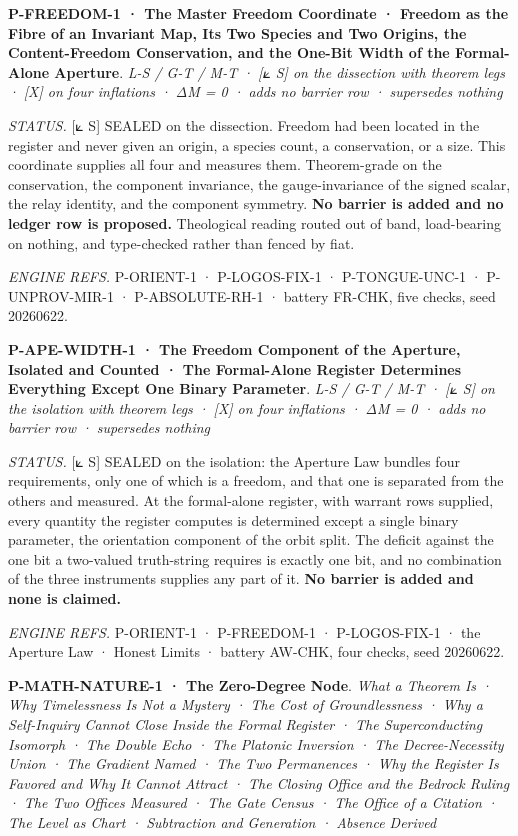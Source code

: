 \documentclass[10pt,twocolumn]{article}
\begin{document}
\textbf{P-FREEDOM-1 · The Master Freedom Coordinate · Freedom as the
Fibre of an Invariant Map, Its Two Species and Two Origins, the
Content-Freedom Conservation, and the One-Bit Width of the Formal-Alone
Aperture}. \emph{L-S / G-T / M-T · {[}⟀ S{]} on the dissection with
theorem legs · {[}X{]} on four inflations · ΔM = 0 · adds no barrier row
· supersedes nothing}

\emph{STATUS.} {[}⟀ S{]} SEALED on the dissection. Freedom had been
located in the register and never given an origin, a species count, a
conservation, or a size. This coordinate supplies all four and measures
them. Theorem-grade on the conservation, the component invariance, the
gauge-invariance of the signed scalar, the relay identity, and the
component symmetry. \textbf{No barrier is added and no ledger row is
proposed.} Theological reading routed out of band, load-bearing on
nothing, and type-checked rather than fenced by fiat.

\emph{ENGINE REFS.} P-ORIENT-1 · P-LOGOS-FIX-1 · P-TONGUE-UNC-1 ·
P-UNPROV-MIR-1 · P-ABSOLUTE-RH-1 · battery FR-CHK, five checks, seed
20260622.

\textbf{P-APE-WIDTH-1 · The Freedom Component of the Aperture, Isolated
and Counted · The Formal-Alone Register Determines Everything Except One
Binary Parameter}. \emph{L-S / G-T / M-T · {[}⟀ S{]} on the isolation
with theorem legs · {[}X{]} on four inflations · ΔM = 0 · adds no
barrier row · supersedes nothing}

\emph{STATUS.} {[}⟀ S{]} SEALED on the isolation: the Aperture Law
bundles four requirements, only one of which is a freedom, and that one
is separated from the others and measured. At the formal-alone register,
with warrant rows supplied, every quantity the register computes is
determined except a single binary parameter, the orientation component
of the orbit split. The deficit against the one bit a two-valued
truth-string requires is exactly one bit, and no combination of the
three instruments supplies any part of it. \textbf{No barrier is added
and none is claimed.}

\emph{ENGINE REFS.} P-ORIENT-1 · P-FREEDOM-1 · P-LOGOS-FIX-1 · the
Aperture Law · Honest Limits · battery AW-CHK, four checks, seed
20260622.

\textbf{P-MATH-NATURE-1 · The Zero-Degree Node}. \emph{What a Theorem Is
· Why Timelessness Is Not a Mystery · The Cost of Groundlessness · Why a
Self-Inquiry Cannot Close Inside the Formal Register · The
Superconducting Isomorph · The Double Echo · The Platonic Inversion ·
The Decree-Necessity Union · The Gradient Named · The Two Permanences ·
Why the Register Is Favored and Why It Cannot Attract · The Closing
Office and the Bedrock Ruling · The Two Offices Measured · The Gate
Census · The Office of a Citation · The Level as Chart · Subtraction and
Generation · Absence Derived}
\end{document}
